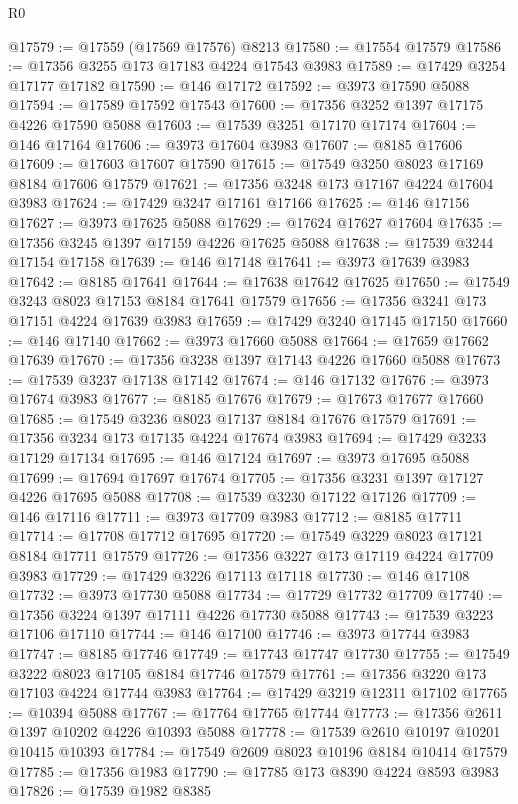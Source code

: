 \begin{lexlean}{R0}
\begin{coremodule}
@17579 := @17559 (@17569 @17576) @8213
@17580 := @17554 @17579
@17586 := @17356 @3255 @173 @17183 @4224 @17543 @3983
@17589 := @17429 @3254 @17177 @17182
@17590 := @146 @17172
@17592 := @3973 @17590 @5088
@17594 := @17589 @17592 @17543
@17600 := @17356 @3252 @1397 @17175 @4226 @17590 @5088
@17603 := @17539 @3251 @17170 @17174
@17604 := @146 @17164
@17606 := @3973 @17604 @3983
@17607 := @8185 @17606
@17609 := @17603 @17607 @17590
@17615 := @17549 @3250 @8023 @17169 @8184 @17606 @17579
@17621 := @17356 @3248 @173 @17167 @4224 @17604 @3983
@17624 := @17429 @3247 @17161 @17166
@17625 := @146 @17156
@17627 := @3973 @17625 @5088
@17629 := @17624 @17627 @17604
@17635 := @17356 @3245 @1397 @17159 @4226 @17625 @5088
@17638 := @17539 @3244 @17154 @17158
@17639 := @146 @17148
@17641 := @3973 @17639 @3983
@17642 := @8185 @17641
@17644 := @17638 @17642 @17625
@17650 := @17549 @3243 @8023 @17153 @8184 @17641 @17579
@17656 := @17356 @3241 @173 @17151 @4224 @17639 @3983
@17659 := @17429 @3240 @17145 @17150
@17660 := @146 @17140
@17662 := @3973 @17660 @5088
@17664 := @17659 @17662 @17639
@17670 := @17356 @3238 @1397 @17143 @4226 @17660 @5088
@17673 := @17539 @3237 @17138 @17142
@17674 := @146 @17132
@17676 := @3973 @17674 @3983
@17677 := @8185 @17676
@17679 := @17673 @17677 @17660
@17685 := @17549 @3236 @8023 @17137 @8184 @17676 @17579
@17691 := @17356 @3234 @173 @17135 @4224 @17674 @3983
@17694 := @17429 @3233 @17129 @17134
@17695 := @146 @17124
@17697 := @3973 @17695 @5088
@17699 := @17694 @17697 @17674
@17705 := @17356 @3231 @1397 @17127 @4226 @17695 @5088
@17708 := @17539 @3230 @17122 @17126
@17709 := @146 @17116
@17711 := @3973 @17709 @3983
@17712 := @8185 @17711
@17714 := @17708 @17712 @17695
@17720 := @17549 @3229 @8023 @17121 @8184 @17711 @17579
@17726 := @17356 @3227 @173 @17119 @4224 @17709 @3983
@17729 := @17429 @3226 @17113 @17118
@17730 := @146 @17108
@17732 := @3973 @17730 @5088
@17734 := @17729 @17732 @17709
@17740 := @17356 @3224 @1397 @17111 @4226 @17730 @5088
@17743 := @17539 @3223 @17106 @17110
@17744 := @146 @17100
@17746 := @3973 @17744 @3983
@17747 := @8185 @17746
@17749 := @17743 @17747 @17730
@17755 := @17549 @3222 @8023 @17105 @8184 @17746 @17579
@17761 := @17356 @3220 @173 @17103 @4224 @17744 @3983
@17764 := @17429 @3219 @12311 @17102
@17765 := @10394 @5088
@17767 := @17764 @17765 @17744
@17773 := @17356 @2611 @1397 @10202 @4226 @10393 @5088
@17778 := @17539 @2610 @10197 @10201 @10415 @10393
@17784 := @17549 @2609 @8023 @10196 @8184 @10414 @17579
@17785 := @17356 @1983
@17790 := @17785 @173 @8390 @4224 @8593 @3983
@17826 := @17539
    @1982
    @8385

\end{coremodule}
\end{lexlean}
